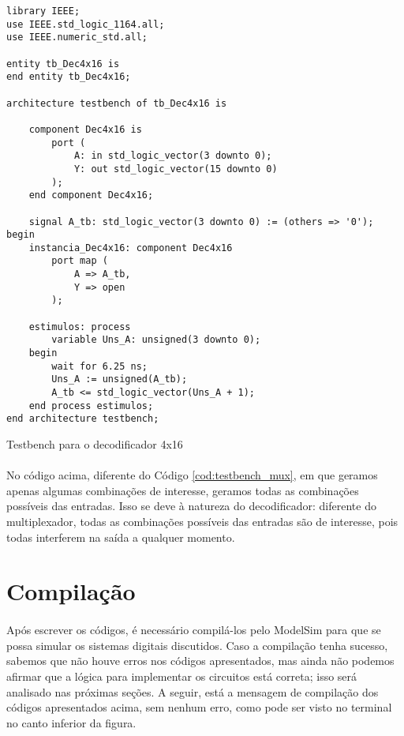 \documentclass[a4paper,12pt]{article}
\newenvironment{code}{\captionsetup{type=listing}}{}
\begin{document}
\begin{code}
\begin{verbatim}
library IEEE;
use IEEE.std_logic_1164.all;
use IEEE.numeric_std.all;

entity tb_Dec4x16 is
end entity tb_Dec4x16;

architecture testbench of tb_Dec4x16 is

    component Dec4x16 is
        port (
            A: in std_logic_vector(3 downto 0);
            Y: out std_logic_vector(15 downto 0)
        );
    end component Dec4x16;
    
    signal A_tb: std_logic_vector(3 downto 0) := (others => '0');
begin
    instancia_Dec4x16: component Dec4x16
        port map (
            A => A_tb,
            Y => open
        );

    estimulos: process
        variable Uns_A: unsigned(3 downto 0);
    begin
        wait for 6.25 ns;
        Uns_A := unsigned(A_tb);
        A_tb <= std_logic_vector(Uns_A + 1);
    end process estimulos;
end architecture testbench;
\end{verbatim}
\caption{Testbench para o decodificador 4x16}
\end{code}

\paragraph{}
No código acima, diferente do Código \autoref{cod:testbench_mux}, em que geramos apenas algumas combinações de interesse, geramos todas as combinações possíveis das entradas. Isso se deve à natureza do decodificador: diferente do multiplexador, todas as combinações possíveis das entradas são de interesse, pois todas interferem na saída a qualquer momento.

\section{Compilação}
\paragraph{}
Após escrever os códigos, é necessário compilá-los pelo ModelSim para que se possa simular os sistemas digitais discutidos. Caso a compilação tenha sucesso, sabemos que não houve erros nos códigos apresentados, mas ainda não podemos afirmar que a lógica para implementar os circuitos está correta; isso será analisado nas próximas seções. A seguir, está a mensagem de compilação dos códigos apresentados acima, sem nenhum erro, como pode ser visto no terminal no canto inferior da figura.
\end{document}
